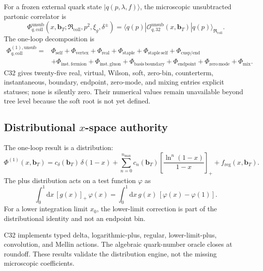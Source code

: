 \documentclass[11pt]{article}
\newcommand{\dd}{\mathrm{d}}
\newcommand{\bT}{\bm b_T}
\newcommand{\cO}{\mathcal O}
\newcommand{\Coll}{\ensuremath{\mathrm{coll}}}
\newcommand{\Unsub}{\ensuremath{\mathrm{unsub}}}
\begin{document}
For a frozen external quark state \(|q(p,\lambda,f)\rangle\), the microscopic unsubtracted partonic correlator is
\begin{equation}
 \Phi_{q,\Coll}^{\Unsub}
 \left(
 x,\bT;
 \mathfrak R_{\Coll},
 p^2,\xi_g,
 \delta^\pm
 \right)
 =
 \langle q(p)|
 \cO_{q,32}^{\Unsub}(x,\bT)
 |q(p)\rangle_{\mathfrak R_{\Coll}}.
 \label{eq:partonic-coll}
\end{equation}
The one-loop decomposition is
\begin{align}
 \Phi_{q,\Coll}^{(1),\Unsub}
 ={}&
 \Phi_{\mathrm{self}}
 +\Phi_{\mathrm{vertex}}
 +\Phi_{\mathrm{real}}
 +\Phi_{\mathrm{staple}}
 +\Phi_{\mathrm{staple\,self}}
 +\Phi_{\mathrm{cusp/end}}
 \nonumber\\
 &+
 \Phi_{\mathrm{inst.\,fermion}}
 +\Phi_{\mathrm{inst.\,gluon}}
 +\Phi_{\mathrm{basis\,boundary}}
 +\Phi_{\mathrm{endpoint}}
 +\Phi_{\mathrm{zero\,mode}}
 +\Phi_{\mathrm{mix}}.
 \label{eq:coll-one-loop}
\end{align}
C32 gives twenty-five real, virtual, Wilson, soft, zero-bin, counterterm, instantaneous, boundary, endpoint, zero-mode, and mixing entries explicit statuses; none is silently zero.  Their numerical values remain unavailable beyond tree level because the soft root is not yet defined.

\subsection{Distributional \texorpdfstring{\(x\)}{x}-space authority}

The one-loop result is a distribution:
\begin{equation}
 \Phi^{(1)}(x,\bT)
 =
 c_{\delta}(\bT)\,\delta(1-x)
 +
 \sum_{n=0}^{n_{\max}}
 c_n(\bT)
 \left[
 \frac{\ln^n(1-x)}{1-x}
 \right]_+
 +
 f_{\mathrm{reg}}(x,\bT).
 \label{eq:distributional-form}
\end{equation}
The plus distribution acts on a test function \(\varphi\) as
\begin{equation}
 \int_0^1\dd x\,
 [g(x)]_+\,\varphi(x)
 =
 \int_0^1\dd x\,
 g(x)\,[\varphi(x)-\varphi(1)].
 \label{eq:plus-def}
\end{equation}
For a lower integration limit \(x_0\), the lower-limit correction is part of the distributional identity and not an endpoint bin.

C32 implements typed delta, logarithmic-plus, regular, lower-limit-plus, convolution, and Mellin actions.  The algebraic quark-number oracle closes at roundoff.  These results validate the distribution engine, not the missing microscopic coefficients.
\end{document}
